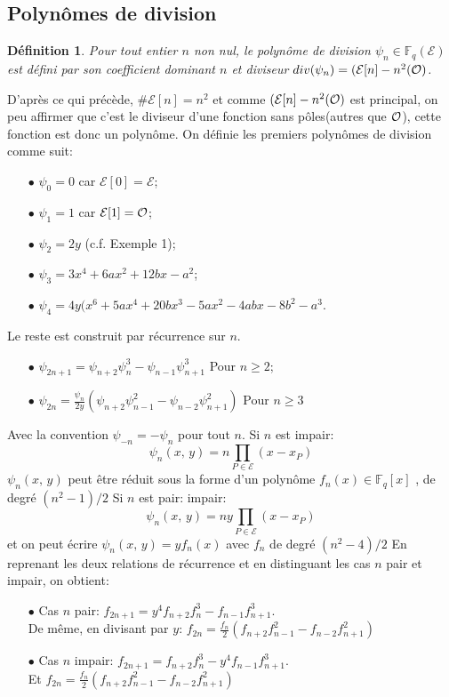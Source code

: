 \documentclass[letterpaper, 12pt]{article}
\newtheorem{defi}{Définition}
\newcommand{\F}{\mathbb{F}_q}
\newcommand{\E}{\mathcal{E}}
\begin{document}
    \subsection{Polynômes de division}
\begin{defi}
    Pour tout entier $n$ non nul, le polynôme de division $\psi_n \in \F(\E)$ est défini par son coefficient dominant $n$ et diviseur $div(\psi_n)=(\E[n]-n^2 (\cal O)$.
\end{defi}
D'après ce qui précède, $\#\E[n]=n^2$ et comme $(\E[n]-n^2 (\cal O)$ est principal, on peu affirmer que c'est le diviseur d'une fonction sans pôles(autres que $\cal O$), cette fonction est donc un polynôme.
\newline
On définie les premiers polynômes de division comme suit:
\begin{itemize}
    \newline
    \item[$\bullet$] $\psi_0 = 0$ car $\E[0]=\E$;
    \item[$\bullet$] $\psi_1 = 1$ car $\E[1]={\cal O}$;
    \item[$\bullet$] $\psi_2 = 2y$ (c.f. Exemple 1);
    \item[$\bullet$] $\psi_3 = 3x^4+6ax^2+12bx-a^2$;
    \item[$\bullet$] $\psi_4 = 4y(x^6+5ax^4+20bx^3-5ax^2-4abx-8b^2-a^3$.
\end{itemize}
Le reste est construit par récurrence sur $n$.
\begin{itemize}
    \newline
    \item[$\bullet$] $\psi_{2n+1}=\psi_{n+2}\psi_n ^3 - \psi_{n-1}\psi_{n+1} ^3$ Pour $n\geq2$;
    \item[$\bullet$] $\psi_{2n}=\frac{\psi_n}{2y}(\psi_{n+2}\psi_{n-1} ^2 - \psi_{n-2}\psi_{n+1} ^2)$ Pour $n\geq3$
\end{itemize}
Avec la convention $\psi_{-n}=-\psi_{n}$ pour tout $n$.
\newline
Si $n$ est impair: $$\psi_n (x,\,y)=n\prod_{P\in \E} (x-x_P)$$
$\psi_n (x,\,y)$ peut être réduit sous la forme d'un polynôme $f_n(x)\in \F[x]$ , de degré $(n^2 -1)/2$
Si $n$ est pair: impair: $$\psi_n (x,\,y)=ny\prod_{P\in \E} (x-x_P)$$
et on peut écrire $\psi_n (x,\,y) = yf_n(x)$ avec $f_n$ de degré $(n^2 -4)/2$
\newline
En reprenant les deux relations de récurrence et en distinguant les cas $n$ pair et impair, on obtient:\\
\begin{itemize}
    \item[$\bullet$] Cas $n$ pair: $f_{2n+1}=y^4f_{n+2}f_n ^3 - f_{n-1}f_{n+1} ^3$.\\
    De même, en divisant par $y$: $f_{2n}=\frac{f_n}{2}(f_{n+2}f_{n-1} ^2 - f_{n-2}f_{n+1} ^2)$
    \item[$\bullet$] Cas $n$ impair: $f_{2n+1}=f_{n+2}f_n ^3 - y^4f_{n-1}f_{n+1} ^3$.\\
    Et $f_{2n}=\frac{f_n}{2}(f_{n+2}f_{n-1} ^2 - f_{n-2}f_{n+1} ^2)$
\end{itemize}
\end{document}
